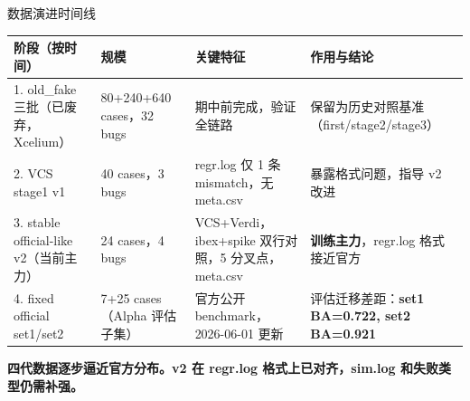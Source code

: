 \documentclass[aspectratio=169,UTF8]{ctexbeamer}
\newcommand{\key}[1]{\textcolor{ICCADBlue}{\textbf{#1}}}
\newcommand{\good}[1]{\textcolor{ICCADGreen}{\textbf{#1}}}
\begin{document}
\begin{frame}{数据演进时间线}
  \small
  \begin{tabularx}{\linewidth}{p{2.4cm}p{2.6cm}Xp{3.0cm}}
    \toprule
    \textbf{阶段（按时间）} & \textbf{规模} & \textbf{关键特征} & \textbf{作用与结论} \\
    \midrule
    1. old\_fake 三批（已废弃，Xcelium） & 80+240+640 cases，32 bugs & 期中前完成，验证全链路 & 保留为历史对照基准（first/stage2/stage3）\\
    2. VCS stage1 v1 & 40 cases，3 bugs & regr.log 仅 1 条 mismatch，无 meta.csv & 暴露格式问题，指导 v2 改进 \\
    3. stable official-like v2（当前主力） & 24 cases，4 bugs & VCS+Verdi，ibex+spike 双行对照，5 分叉点，meta.csv & \textbf{训练主力}，regr.log 格式接近官方 \\
    4. fixed official set1/set2 & 7+25 cases（Alpha 评估子集） & 官方公开 benchmark，2026-06-01 更新 & 评估迁移差距：\good{set1 BA=0.722, set2 BA=0.921} \\
    \bottomrule
  \end{tabularx}

  \vspace{3mm}
  \begin{center}
    \key{四代数据逐步逼近官方分布。v2 在 regr.log 格式上已对齐，sim.log 和失败类型仍需补强。}
  \end{center}
\end{frame}
\end{document}
